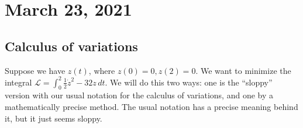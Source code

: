 \section{March 23, 2021} 
\subsection{Calculus of variations}
Suppose we have $z(t)$, where $z(0)=0,z(2)=0$. We want to minimize the integral $\mathcal{L} =\int_0^2 \frac{1}{2}\dot z^2-32z \, dt$. We will do this two ways: one is the ``sloppy'' version with our usual notation for the calculus of variations, and one by a mathematically precise method. The usual notation has a precise meaning behind it, but it just seems sloppy.

